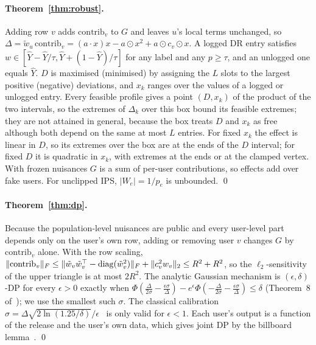 \paragraph{Theorem~\ref{thm:robust}.}
Adding row $v$ adds $\mathrm{contrib}_v$ to $G$ and leaves $u$'s local terms
unchanged, so $\Delta=\tilde w_u\,\mathrm{contrib}_v=(a\cdot x)x-a\odot x^2+a\odot c_v\odot x$.
A logged DR entry satisfies $w\in[\hat Y-\hat Y/\tau,\hat Y+(1-\hat Y)/\tau]$ for any label
and any $p\ge\tau$, and an unlogged one equals $\hat Y$. $D$ is maximised
(minimised) by assigning the $L$ slots to the largest positive (negative)
deviations, and $x_k$ ranges over the values of a logged or unlogged entry.
Every feasible profile gives a point $(D,x_k)$ of the product of the two
intervals, so the extremes of $\Delta_k$ over this box bound its feasible
extremes; they are not attained in general, because the box treats $D$ and
$x_k$ as free although both depend on the same at most $L$ entries. For fixed
$x_k$ the effect is linear in $D$, so its extremes over the box are at the ends
of the $D$ interval; for fixed $D$ it is quadratic in $x_k$, with extremes at the
ends or at the clamped vertex. With frozen nuisances $G$ is a sum of
per-user contributions, so effects add over fake users. For
unclipped IPS, $|W_e|=1/p_e$ is unbounded. \qed

\paragraph{Theorem~\ref{thm:dp}.}
Because the population-level nuisances are public and every user-level part
depends only on the user's own row, adding or removing user $v$ changes $G$ by
$\mathrm{contrib}_v$ alone. With the row scaling,
$\|\mathrm{contrib}_v\|_F\le\|\tilde w_v\tilde w_v^\top-\operatorname{diag}(\tilde w_v^2)\|_F+\|c_v^2w_v\|_2\le R^2+R^2$,
so the $\ell_2$-sensitivity of the upper triangle is at most $2R^2$. The analytic
Gaussian mechanism is $(\epsilon,\delta)$-DP for every $\epsilon>0$ exactly when
$\Phi(\frac{\Delta}{2\sigma}-\frac{\epsilon\sigma}{\Delta})-e^\epsilon\Phi(-\frac{\Delta}{2\sigma}-\frac{\epsilon\sigma}{\Delta})\le\delta$
(Theorem~8 of~\cite{balle2018analytic}); we use the smallest such $\sigma$. The
classical calibration $\sigma=\Delta\sqrt{2\ln(1.25/\delta)}/\epsilon$~\cite{dwork2014algorithmic}
is only valid for $\epsilon<1$. Each user's output is a function of the release and
the user's own data, which gives joint DP by the billboard
lemma~\cite{hsu2014matchings}. \qed

